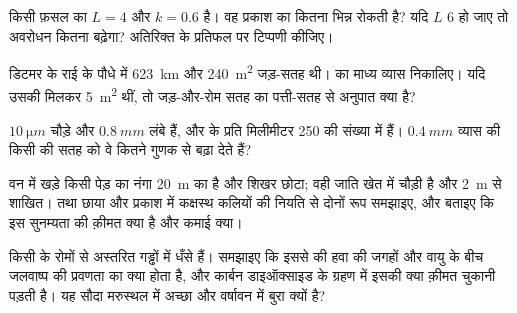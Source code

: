\begin{exercise}[$\star\star$]\label{exo:b1:flowering-plant-organization:7}
किसी फ़सल का $L = 4$ और $k = 0.6$ है। वह प्रकाश का कितना भिन्न रोकती है?
यदि $L$ 6 हो जाए तो अवरोधन कितना बढ़ेगा? अतिरिक्त  के प्रतिफल
पर टिप्पणी कीजिए।
\end{exercise}

\begin{exercise}[$\star\star$]\label{exo:b1:flowering-plant-organization:8}
डिटमर के राई के पौधे में \qty{623}{km}  और \qty{240}{m^2} जड़-सतह
थी।  का माध्य व्यास निकालिए। यदि उसकी  मिलकर \qty{5}{m^2}
थीं, तो जड़-और-रोम सतह का पत्ती-सतह से अनुपात क्या है?
\end{exercise}

\begin{exercise}[$\star\star$]\label{exo:b1:flowering-plant-organization:9}
 $\qty{10}{\micro m}$ चौड़े और $\qty{0.8}{mm}$ लंबे हैं, और 
के प्रति मिलीमीटर \qty{250}{} की संख्या में हैं। $\qty{0.4}{mm}$ व्यास
की किसी  की सतह को वे कितने गुणक से बढ़ा देते हैं?
\end{exercise}

\begin{exercise}[$\star\star\star$]\label{exo:b1:flowering-plant-organization:10}
वन में खड़े किसी पेड़ का नंगा  \qty{20}{m} का है और शिखर छोटा; वही
जाति खेत में चौड़ी है और \qty{2}{m} से शाखित।  तथा छाया और
प्रकाश में कक्षस्थ कलियों की नियति से दोनों रूप समझाइए, और बताइए कि इस
सुनम्यता की क़ीमत क्या है और कमाई क्या।
\end{exercise}

\begin{exercise}[$\star\star\star$]\label{exo:b1:flowering-plant-organization:11}
किसी  के  रोमों से अस्तरित गड्ढों में धँसे हैं। समझाइए
कि इससे  की हवा की जगहों और वायु के बीच जलवाष्प की प्रवणता का क्या
होता है, और कार्बन डाइऑक्साइड के ग्रहण में इसकी क्या क़ीमत चुकानी पड़ती
है। यह सौदा मरुस्थल में अच्छा और वर्षावन में बुरा क्यों है?
\end{exercise}

